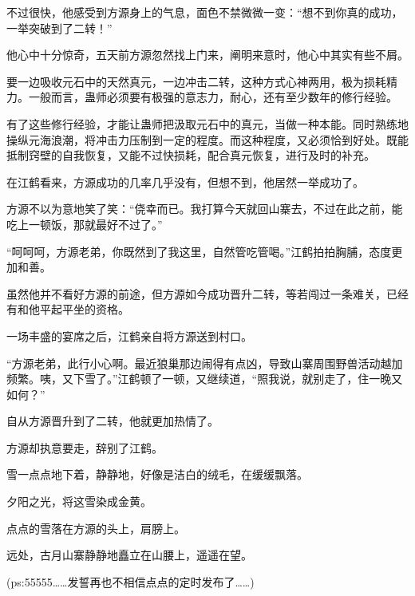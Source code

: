 \begin{this_body}
不过很快，他感受到方源身上的气息，面色不禁微微一变：“想不到你真的成功，一举突破到了二转！”

他心中十分惊奇，五天前方源忽然找上门来，阐明来意时，他心中其实有些不屑。

要一边吸收元石中的天然真元，一边冲击二转，这种方式心神两用，极为损耗精力。一般而言，蛊师必须要有极强的意志力，耐心，还有至少数年的修行经验。

有了这些修行经验，才能让蛊师把汲取元石中的真元，当做一种本能。同时熟练地操纵元海浪潮，将冲击力压制到一定的程度。而这种程度，又必须恰到好处。既能抵制窍壁的自我恢复，又能不过快损耗，配合真元恢复，进行及时的补充。

在江鹤看来，方源成功的几率几乎没有，但想不到，他居然一举成功了。

方源不以为意地笑了笑：“侥幸而已。我打算今天就回山寨去，不过在此之前，能吃上一顿饭，那就最好不过了。”

“呵呵呵，方源老弟，你既然到了我这里，自然管吃管喝。”江鹤拍拍胸脯，态度更加和善。

虽然他并不看好方源的前途，但方源如今成功晋升二转，等若闯过一条难关，已经有和他平起平坐的资格。

一场丰盛的宴席之后，江鹤亲自将方源送到村口。

“方源老弟，此行小心啊。最近狼巢那边闹得有点凶，导致山寨周围野兽活动越加频繁。咦，又下雪了。”江鹤顿了一顿，又继续道，“照我说，就别走了，住一晚又如何？”

自从方源晋升到了二转，他就更加热情了。

方源却执意要走，辞别了江鹤。

雪一点点地下着，静静地，好像是洁白的绒毛，在缓缓飘落。

夕阳之光，将这雪染成金黄。

点点的雪落在方源的头上，肩膀上。

远处，古月山寨静静地矗立在山腰上，遥遥在望。

(ps:55555……发誓再也不相信点点的定时发布了……)

\end{this_body}


